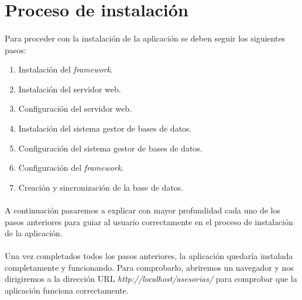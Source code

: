 \section{Proceso de instalación}\label{instalacion}

  \paragraph{}Para proceder con la instalación de la aplicación se deben seguir
  los siguientes pasos:

  \begin{enumerate}
   \item Instalación del \textit{framework}.
   \item Instalación del servidor web.
   \item Configuración del servidor web.
   \item Instalación del sistema gestor de bases de datos.
   \item Configuración del sistema gestor de bases de datos.
   \item Configuración del \textit{framework}.
   \item Creación y sincronización de la base de datos.
  \end{enumerate}

  \paragraph{}A continuación pasaremos a explicar con mayor profundidad cada
  uno de los pasos anteriores para guiar al usuario correctamente en el proceso
  de instalación de la aplicación.

  \begin{enumerate}
    
    
    
    
    
    
    
  \end{enumerate}

  \paragraph{}Una vez completados todos los pasos anteriores, la aplicación
  quedaría instalada completamente y funcionando. Para comprobarlo, abriremos
  un navegador y nos dirigiremos a la dirección URL
  \textit{http://localhost/asesorias/} para comprobar que la aplicación funciona
  correctamente.